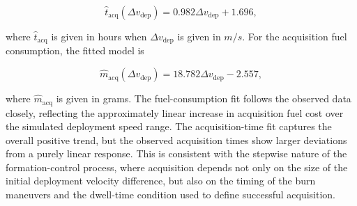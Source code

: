 \begin{equation}
\hat{t}_{\mathrm{acq}}(\Delta v_{\mathrm{dep}}) =
0.982 \Delta v_{\mathrm{dep}} + 1.696 ,
\end{equation}

where $\hat{t}_{\mathrm{acq}}$ is given in hours when $\Delta v_{\mathrm{dep}}$ is given in $m/s$. For the acquisition fuel consumption, the fitted model is

\begin{equation}
\hat{m}_{\mathrm{acq}}(\Delta v_{\mathrm{dep}}) =
18.782 \Delta v_{\mathrm{dep}} - 2.557 ,
\end{equation}

where $\hat{m}_{\mathrm{acq}}$ is given in grams. The fuel-consumption fit follows the observed data closely, reflecting the approximately linear increase in acquisition fuel cost over the simulated deployment speed range. The acquisition-time fit captures the overall positive trend, but the observed acquisition times show larger deviations from a purely linear response. This is consistent with the stepwise nature of the formation-control process, where acquisition depends not only on the size of the initial deployment velocity difference, but also on the timing of the burn maneuvers and the dwell-time condition used to define successful acquisition.


